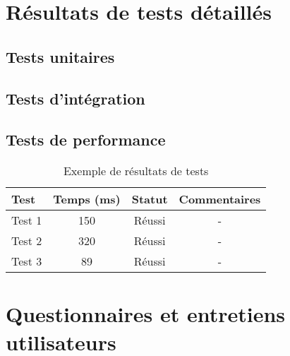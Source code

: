 \begin{appendices}
    \chapter{Résultats de tests détaillés}
    \label{app:test_results}

    \section{Tests unitaires}


    \section{Tests d'intégration}


    \section{Tests de performance}


    \begin{table}[h]
        \centering
        \begin{tabular}{|l|c|c|c|}
            \hline
            \textbf{Test} & \textbf{Temps (ms)} & \textbf{Statut} & \textbf{Commentaires} \\
            \hline
            Test 1        & 150                 & Réussi          & -                     \\
            Test 2        & 320                 & Réussi          & -                     \\
            Test 3        & 89                  & Réussi          & -                     \\
            \hline
        \end{tabular}
        \caption{Exemple de résultats de tests}
        \label{tab:test_results}
    \end{table}

    \chapter{Questionnaires et entretiens utilisateurs}
    \label{app:surveys}


\end{appendices}
